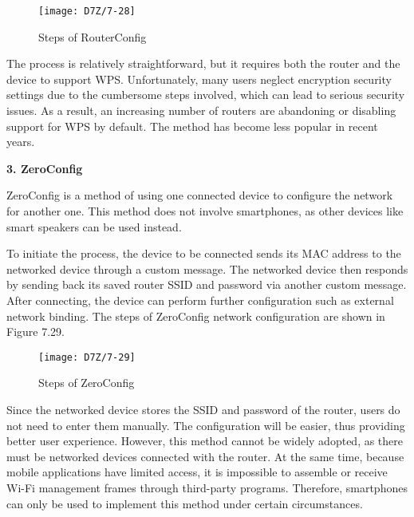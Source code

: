 \documentclass[a4paper,12pt]{book}
\begin{document}
\begin{figure}[!h]
    \centering
    \texttt{[image: D7Z/7-28]}
    \caption{Steps of RouterConfig}
\end{figure}

The process is relatively straightforward, but it requires both the router and the device to support WPS. Unfortunately, many users neglect encryption security settings due to the cumbersome steps involved, which can lead to serious security issues. As a result, an increasing number of routers are abandoning or disabling support for WPS by default. The method has become less popular in recent years.


\textbf{3. ZeroConfig}

ZeroConfig is a method of using one connected device to configure the network for another one. This method does not involve smartphones, as other devices like smart speakers can be used instead.

To initiate the process, the device to be connected sends its MAC address to the networked device through a custom message. The networked device then responds by sending back its saved router SSID and password via another custom message. After connecting, the device can perform further configuration such as external network binding. The steps of ZeroConfig network configuration are shown in Figure 7.29.

\begin{figure}[!h]
    \centering
    \texttt{[image: D7Z/7-29]}
    \caption{Steps of ZeroConfig}
\end{figure}

Since the networked device stores the SSID and password of the router, users do not need to enter them manually. The configuration will be easier, thus providing better user experience. However, this method cannot be widely adopted, as there must be networked devices connected with the router. At the same time, because mobile applications have limited access, it is impossible to assemble or receive Wi-Fi management frames through third-party programs. Therefore, smartphones can only be used to implement this method under certain circumstances.
\end{document}
